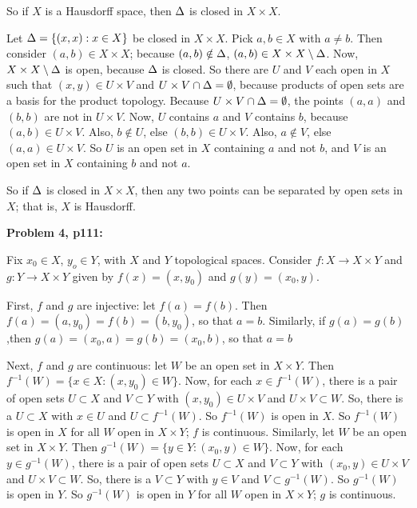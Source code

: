 \documentclass[a4paper,12pt]{article}
\begin{document}
So if $X$ is a Hausdorff space, then $\Delta$ is closed in $X \times X$. 

Let $\Delta = \{(x,x): x \in X\}$ be closed in $X \times X$. Pick $a,b \in X$ with $a \neq b$. Then consider $(a,b) \in X \times X$; because $(a,b) \notin \Delta$, $(a,b) \in X \times X \setminus \Delta$. Now, $X \times X \setminus \Delta$ is open, because $\Delta$ is closed. So there are $U$ and $V$ each open in $X$ such that $(x,y) \in U \times V$ and $U \times V \cap \Delta = \emptyset$, because products of open sets are a basis for the product topology. Because $U \times V \cap \Delta = \emptyset$, the points $(a,a)$ and $(b,b)$ are not in $U \times V$. Now, $U$ contains $a$ and $V$ contains $b$, because $(a,b) \in U \times V$. Also, $b \notin U$, else $(b,b) \in U \times V$. Also, $a \notin V$, else $(a,a) \in U \times V$. So $U$ is an open set in $X$ containing $a$ and not $b$, and $V$ is an open set in $X$ containing $b$ and not $a$.

So if $\Delta$ is closed in $X \times X$, then any two points can be separated by open sets in $X$; that is, $X$ is Hausdorff.

\shunt

{\bf Problem 4, p111:}

Fix $x_0 \in X$, $y_o \in Y$, with $X$ and $Y$ topological spaces. Consider $f: X \to X \times Y$ and $g: Y \to X \times Y$ given by $f(x) = (x,y_0)$ and $g(y) = (x_0,y)$.

First, $f$ and $g$ are injective: let $f(a) = f(b)$. Then $f(a) = (a,y_0) = f(b) = (b,y_0)$, so that $a=b$. Similarly, if $g(a) = g(b)$ ,then $g(a) = (x_0,a) = g(b) = (x_0,b)$, so that $a=b$

Next, $f$ and $g$ are continuous: let $W$ be an open set in $X \times Y$. Then $f^{-1}(W) = \{x \in X: (x,y_0) \in W \}$. Now, for each $x \in f^{-1}(W)$, there is a pair of open sets $U \subset X$ and $V \subset Y$ with $(x,y_0) \in U \times V$ and $U \times V \subset W$. So, there is a $U \subset X$ with $x \in U$ and $U \subset f^{-1}(W)$. So $f^{-1}(W)$ is open in $X$. So $f^{-1}(W)$ is open in $X$ for all $W$ open in $X \times Y$; $f$ is continuous. Similarly, let $W$ be an open set in $X \times Y$. Then $g^{-1}(W) = \{y \in Y: (x_0,y) \in W \}$. Now, for each $y \in g^{-1}(W)$, there is a pair of open sets $U \subset X$ and $V \subset Y$ with $(x_0,y) \in U \times V$ and $U \times V \subset W$. So, there is a $V \subset Y$ with $y \in V$ and $V \subset g^{-1}(W)$. So $g^{-1}(W)$ is open in $Y$. So $g^{-1}(W)$ is open in $Y$ for all $W$ open in $X \times Y$; $g$ is continuous.
\end{document}
